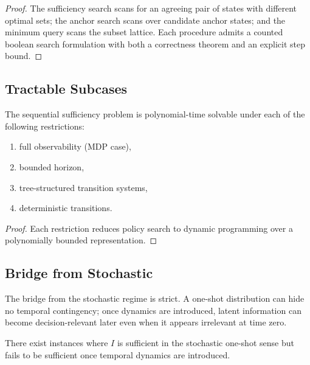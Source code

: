 \begin{proof}
The sufficiency search scans for an agreeing pair of states with different optimal sets; the anchor search scans over candidate anchor states; and the minimum query scans the subset lattice. Each procedure admits a counted boolean search formulation with both a correctness theorem and an explicit step bound.
\end{proof}

\subsection{Tractable Subcases}

\begin{proposition}\label{prop:sequential-tractable}
The sequential sufficiency problem is polynomial-time solvable under each of the following restrictions:
\begin{enumerate}
\item full observability (MDP case),
\item bounded horizon,
\item tree-structured transition systems,
\item deterministic transitions.
\end{enumerate}
\end{proposition}


\begin{proof}
Each restriction reduces policy search to dynamic programming over a polynomially bounded representation.
\end{proof}

\subsection{Bridge from Stochastic}

The bridge from the stochastic regime is strict. A one-shot distribution can hide no temporal contingency; once dynamics are introduced, latent information can become decision-relevant later even when it appears irrelevant at time zero.

\begin{proposition}\label{prop:stochastic-not-sequential}
There exist instances where $I$ is sufficient in the stochastic one-shot sense but fails to be sufficient once temporal dynamics are introduced.
\end{proposition}


